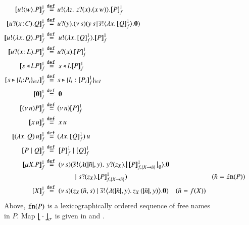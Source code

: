 
\begin{figure}[t!]


\begin{align*}
	\pmapp{\bout{u}{w} P}{1}{f}	&\defeq	\!\bout{u}{ \abs{z}{\,\binp{z}{x} (\appl{x}{w})} } \pmapp{P}{1}{f}
	\\
	\pmapp{\binp{u}{\AT{x}{C}} Q}{1}{f}	&\defeq	\!\binp{u}{y} \newsp{s}{\appl{y}{s} \!\Par\! \bout{\dual{s}}{\abs{x}{\pmapp{Q}{1}{f}}} \inact}
		\\
	\pmapp{\bout{u}{\abs{{x}}{Q}} P}{1}{f}  &\defeq \bout{u}{\abs{{x}}{\pmapp{Q}{1}{f}}} \pmapp{P}{1}{f}
	\\
	\pmapp{\binp{u}{\AT{x}{L}} P}{1}{f} &\defeq \!\binp{u}{x} \pmapp{P}{1}{f}
	\\
	\pmapp{\bsel{s}{l} P}{1}{f} &\defeq \bsel{s}{l} \pmapp{P}{1}{f}
	\\
	\pmapp{\bbra{s}{l_i{:}P_i}_{i \in I}}{1}{f} &\defeq \!\bbra{s}{l_i: \pmapp{P_i}{1}{f}}_{i \in I}
	\\
	\pmapp{\inact}{1}{f} &\defeq \inact
	\\
	\pmapp{\news{n} P}{1}{f} &\defeq \!\news{n} \pmapp{P}{1}{f}
	\\
	\pmapp{{x}\, {u}}{1}{f} &\defeq \appl{x}{u}
	\\
	\pmapp{\appl{(\abs{x}{Q})}{u}}{1}{f} &\defeq \!\appl{(\abs{x}{\pmapp{Q}{1}{f}})}{u}
	\\	
	\pmapp{P \Par Q}{1}{f} & \defeq \pmapp{P}{1}{f} \Par \pmapp{Q}{1}{f}
	\\
	\pmapp{\recp{X}{P}}{1}{f} &\defeq
		\newsp{s}{\bout{\dual{s}}{\abs{(\vmap{\tilde{n}}, y)} \,{\binp{y}{z_\X} \auxmapp{\pmapp{P}{1}{{f,\{\rvar{X}\to \tilde{n}\}}}}{{}}{\es}}} \inact 
		\\
		& \qquad \qquad \Par  \binp{s}{z_\X} \pmapp{P}{1}{{f,\{\rvar{X}\to \tilde{n}\}}}}
	\qquad \qquad \qquad \qquad \qquad \qquad
	(\tilde{n} = \fn{P})
	\\ 
	\pmapp{\rvar{X}}{1}{f} & \defeq 
		\newsp{s}{\appl{z_X}{(\tilde{n}, s)} \Par \bbout{\dual{s}}{ \abs{(\vmap{\tilde{n}},y)}{\appl{z_X}{(\vmap{\tilde{n}}, y)}}} \inact}  \quad (\tilde{n} = f(\rvar{X}))
\end{align*}
Above,
$\mathtt{fn}(P)$ is a lexicographically ordered sequence  of free names in $P$.
Map
$\big\lfloor\!\!\big\lfloor\cdot\big\rfloor\!\!\big\rfloor^{}_\sigma$ is given in 
 and .
\\[1mm]
\begin{align*}

\end{align*}
\end{figure}
